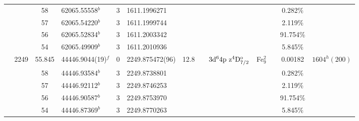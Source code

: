 \begin{table*}
\begin{center}
{\begin{tabular}{:l;l;c;l;c;l;c;l;l;c;c;c;c}
\rowstyle{\itshape}               &        & 58        & 62065.55558$^{b}$                & 3 &  1611.1996271      &      & $                                        $ & $                                        $ &             &              & 0.282\%   & $     ^{}     $\\
\rowstyle{\itshape}               &        & 57        & 62065.54220$^{b}$                & 3 &  1611.1999744      &      & $                                        $ & $                                        $ &             &              & 2.119\%   & $     ^{}     $\\
\rowstyle{\itshape}               &        & 56        & 62065.52834$^{b}$                & 3 &  1611.2003342      &      & $                                        $ & $                                        $ &             &              & 91.754\%  & $     ^{}     $\\
\rowstyle{\itshape}               &        & 54        & 62065.49909$^{b}$                & 3 &  1611.2010936      &      & $                                        $ & $                                        $ &             &              & 5.845\%   & $     ^{}     $\\
                                  & 2249   & 55.845    & 44446.9044(19)$^{f}$             & 0 &   2249.875472(96)  & 12.8 & $                                        $ & $3\rm{d}^64\rm{p~z}^4\rm{D}_{7/2}^{\rm o}$ & Fe$^2_{9}$  &              & 0.00182   & $ 1604^{h}(200)$\\
\rowstyle{\itshape}               &        & 58        & 44446.93584$^{b}$                & 3 &  2249.8738801      &      & $                                        $ & $                                        $ &             &              & 0.282\%   & $     ^{}     $\\
\rowstyle{\itshape}               &        & 57        & 44446.92112$^{b}$                & 3 &  2249.8746253      &      & $                                        $ & $                                        $ &             &              & 2.119\%   & $     ^{}     $\\
\rowstyle{\itshape}               &        & 56        & 44446.90587$^{b}$                & 3 &  2249.8753970      &      & $                                        $ & $                                        $ &             &              & 91.754\%  & $     ^{}     $\\
\rowstyle{\itshape}               &        & 54        & 44446.87369$^{b}$                & 3 &  2249.8770263      &      & $                                        $ & $                                        $ &             &              & 5.845\%   & $     ^{}     $\\

\end{tabular}}
\end{center}
\end{table*}
